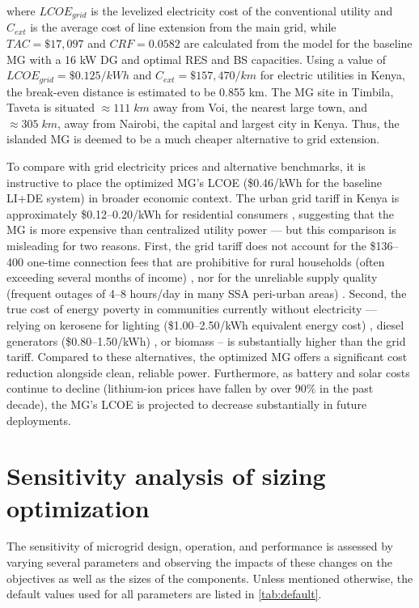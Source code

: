\documentclass[final,3p,times]{elsarticle}
\begin{document}
where $LCOE_{grid}$ is the levelized electricity cost of the conventional utility and $C_{ext}$ is the average cost of line extension from the main grid, while $TAC = \$17,097$ and $CRF = 0.0582$ are calculated from the model for the baseline MG with a 16 kW DG and optimal RES and BS capacities. Using a value of $LCOE_{grid} = \$ 0.125/kWh$ \cite{LCOEgrid} and $C_{ext} = \$157,470/km$ \cite{Cext} for electric utilities in Kenya, the break-even distance is estimated to be 0.855 km. The MG site in Timbila, Taveta is situated $\approx 111 \; km$ away from Voi, the nearest large town, and $\approx 305 \; km$, away from Nairobi, the capital and largest city in Kenya. Thus, the islanded MG is deemed to be a much cheaper alternative to grid extension.

 To compare with grid electricity prices and alternative benchmarks, it is instructive to place the optimized MG's LCOE (\$0.46/kWh for the baseline LI+DE system) in broader economic context. The urban grid tariff in Kenya is approximately \$0.12--0.20/kWh for residential consumers \cite{LCOEgrid}, suggesting that the MG is more expensive than centralized utility power --- but this comparison is misleading for two reasons. First, the grid tariff does not account for the \$136--400 one-time connection
fees that are prohibitive for rural households (often exceeding several months
of income) \cite{quak_CBA, golumbeanu2013}, nor for the unreliable supply
quality (frequent outages of 4--8 hours/day in many SSA peri-urban areas)
\cite{iea_africa2019}. Second, the true cost of energy poverty in communities
currently without electricity --- relying on kerosene for lighting
(\$1.00--2.50/kWh equivalent energy cost) \cite{tracy2012}, diesel generators
(\$0.80--1.50/kWh) \cite{quak_CBA}, or biomass -- is substantially higher
than the grid tariff. Compared to these alternatives, the optimized MG offers a significant cost reduction alongside clean, reliable power. Furthermore, as battery and solar costs continue to decline (lithium-ion prices have fallen by over 90\% in the past decade), the MG's LCOE is projected to decrease substantially in future deployments.

\section{Sensitivity analysis of sizing optimization\label{sec:sizing_sensitivity}}

The sensitivity of microgrid design, operation, and performance is assessed by varying several parameters and observing the impacts of these changes on the objectives as well as the sizes of the components. Unless mentioned otherwise, the default values used for all parameters are listed in \cref{tab:default}. 
\end{document}
